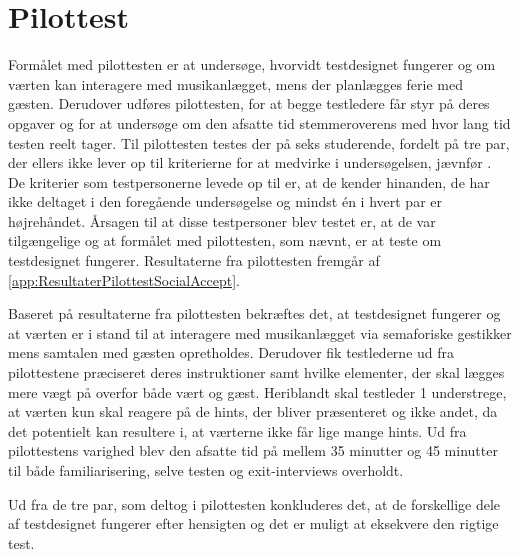 \section{Pilottest}
\label{PilottestSocialAccept}
%
Formålet med pilottesten er at undersøge, hvorvidt testdesignet fungerer og om værten kan interagere med musikanlægget, mens der planlægges ferie med gæsten. Derudover udføres pilottesten, for at begge testledere får styr på deres opgaver og for at undersøge om den afsatte tid stemmeroverens med hvor lang tid testen reelt tager. \blankline
%
Til pilottesten testes der på seks studerende, fordelt på tre par, der ellers ikke lever op til kriterierne for at medvirke i undersøgelsen, jævnfør . De kriterier som testpersonerne levede op til er, at de kender hinanden, de har ikke deltaget i den foregående undersøgelse og mindst én i hvert par er højrehåndet. Årsagen til at disse testpersoner blev testet er, at de var tilgængelige og at formålet med pilottesten, som nævnt, er at teste om testdesignet fungerer. Resultaterne fra pilottesten fremgår af \autoref{app:ResultaterPilottestSocialAccept}. 

Baseret på resultaterne fra pilottesten bekræftes det, at testdesignet fungerer og at værten er i stand til at interagere med musikanlægget via semaforiske gestikker mens samtalen med gæsten opretholdes. Derudover fik testlederne ud fra pilottestene præciseret deres instruktioner samt hvilke elementer, der skal lægges mere vægt på overfor både vært og gæst. Heriblandt skal testleder 1 understrege, at værten kun skal reagere på de hints, der bliver præsenteret og ikke andet, da det potentielt kan resultere i, at værterne ikke får lige mange hints. Ud fra pilottestens varighed blev den afsatte tid på mellem 35 minutter og 45 minutter til både familiarisering, selve testen og exit-interviews overholdt.

Ud fra de tre par, som deltog i pilottesten konkluderes det, at de forskellige dele af testdesignet fungerer efter hensigten og det er muligt at eksekvere den rigtige test. 

